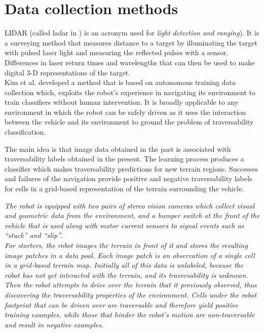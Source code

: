 \documentclass[12pt,a4paper]{report}
\newcommand{\example}{\enquote}
\newcommand{\term}{\textit}
\begin{document}
	\section{Data collection methods}
	\label{sec:bg:data}
	
	LIDAR (called ladar in \cite{Lalonde}) is an acronym used for \term{light 
	detection and ranging}). It is a surveying method that measures distance to 
	a target by illuminating the target with pulsed laser light and measuring 
	the reflected pulses with a sensor. Differences in laser return times and 
	wavelengths that can then be used to make digital 3-D representations of the 
	target.
	\\
	
	
	Kim et al. \cite{Kim} developed a method 
	that is based on autonomous training data collection which, exploits the 
	robot’s experience in navigating its environment to train classifiers without 
	human intervention. It is broadly applicable to any environment in which 
	the robot can be safely driven as it uses the interaction between the vehicle
	and its environment to ground the problem of traversability classification.
	
	The main idea is that image data  obtained in the past is associated with 
	traversability labels obtained in the  present. The learning process produces a 
	classifier which makes traversability  predictions for new terrain regions. 
	Successes and failures of the navigation provide positive and negative 
	traversability labels for cells in a grid-based representation of the terrain surrounding 
	the vehicle.
	
	\textit{The robot is equipped with two pairs of stereo vision cameras which 
	collect visual and geometric data from the environment, and a bumper switch
	at the front of the vehicle that is used along with motor current sensors to 
	signal events such as \example{stuck} and \example{slip}.
	\\
	For starters, the robot images the terrain in front of it and stores the 
	resulting image patches in a data pool. Each image patch is an observation 
	of a single cell in a grid-based terrain map. Initially all of this data is 
	unlabeled, because the robot has not yet interacted with the terrain, and its 
	traversability is unknown. 
	\\
	Then the robot attempts to drive over the terrain that it previously 
	observed, thus discovering the traversability properties of the environment. 
	Cells under the robot footprint that can be driven over are traversable and 
	therefore yield positive training examples, while those that hinder the robot’s 
	motion are non-traversable	and result in negative examples.}
	
\end{document}
